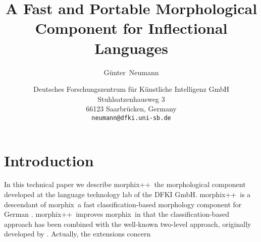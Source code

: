 

\newcommand{\mona}{{\sc morphix++}}
\newcommand{\morphix}{{\sc morphix}}

\title{A Fast and Portable Morphological Component 
        for Inflectional Languages}


\author{G\"{u}nter~Neumann}

\date{Deutsches Forschungszentrum f\"ur K\"unstliche 
Intelligenz GmbH\\
Stuhlsatzenhausweg 3\\
66123 Saarbr\"ucken, Germany\\
{\tt neumann@dfki.uni-sb.de}}


\maketitle

\section{Introduction}

In this technical paper we describe \mona\ the morphological
component developed at the language technology lab of the DFKI
GmbH. \mona\ is a descendant of \morphix\, a fast
classification-based morphology  component for German
\cite{Morphixmemo:86,Morphix:88}. \mona\ improves \morphix\ in that the
classification-based approach has been combined with the well-known
two-level approach, originally developed by
\cite{Koskenniemi83,Koskenniemi84}. Actually, the extensions concern


